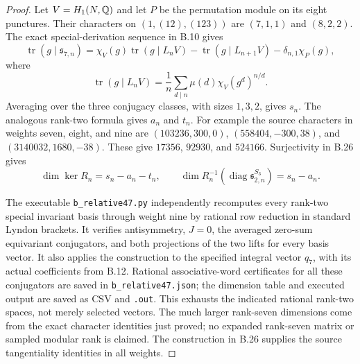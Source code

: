 \begin{proof}
Let $V=H_1(N,\mathbb Q)$ and let $P$ be the permutation module on its eight
punctures. Their characters on $(1,(12),(123))$ are $(7,1,1)$ and
$(8,2,2)$. The exact special-derivation sequence in B.10 gives
\[
 \operatorname{tr}(g\mid\mathfrak s_{7,n})
 =\chi_V(g)\operatorname{tr}(g\mid L_nV)
   -\operatorname{tr}(g\mid L_{n+1}V)-\delta_{n,1}\chi_P(g),
\]
where
\[
 \operatorname{tr}(g\mid L_nV)
   =\frac1n\sum_{d\mid n}\mu(d)\chi_V(g^d)^{n/d}.
\]
Averaging over the three conjugacy classes, with sizes $1,3,2$,
gives $s_n$. The analogous rank-two formula gives $a_n$ and $t_n$.
For example the source characters in weights seven, eight, and nine
are $(103236,300,0)$, $(558404,-300,38)$, and
$(3140032,1680,-38)$. These give $17356$, $92930$, and $524166$.
Surjectivity in B.26 gives
\[
 \dim\ker R_n=s_n-a_n-t_n,\qquad
 \dim R_n^{-1}(\operatorname{diag}\mathfrak s_{2,n}^{S_3})=s_n-a_n.
\]

The executable \texttt{b\_relative47.py} independently recomputes
every rank-two special invariant basis through weight nine by rational
row reduction in standard Lyndon brackets. It verifies antisymmetry,
$J=0$, the averaged zero-sum equivariant conjugators, and both
projections of the two lifts for every basis vector. It also applies
the construction to the specified integral vector $q_7$, with its
actual coefficients from B.12. Rational associative-word certificates
for all these conjugators are saved in \texttt{b\_relative47.json};
the dimension table and executed output are saved as CSV and
\texttt{.out}. This exhausts the indicated rational rank-two spaces,
not merely selected vectors. The much larger rank-seven dimensions
come from the exact character identities just proved; no expanded
rank-seven matrix or sampled modular rank is claimed. The construction
in B.26 supplies the source tangentiality identities in all weights.
\end{proof}

